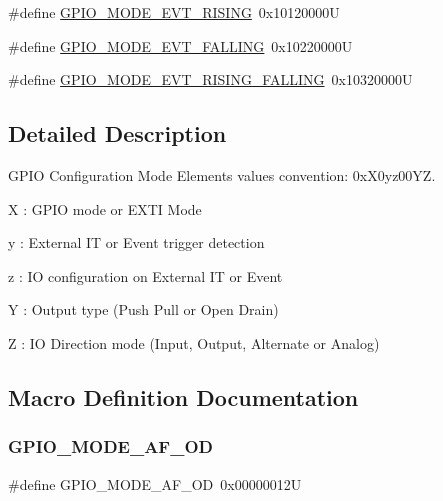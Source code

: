 \begin{DoxyCompactItemize}
\item 
\#define \mbox{\hyperlink{group___g_p_i_o__mode__define_ga97d78b82ea178ff7a4c35aa60b4e9338}{G\+P\+I\+O\+\_\+\+M\+O\+D\+E\+\_\+\+E\+V\+T\+\_\+\+R\+I\+S\+I\+NG}}~0x10120000U
\item 
\#define \mbox{\hyperlink{group___g_p_i_o__mode__define_gadbfa532b3566783ac6c0e07c2e0ffe5e}{G\+P\+I\+O\+\_\+\+M\+O\+D\+E\+\_\+\+E\+V\+T\+\_\+\+F\+A\+L\+L\+I\+NG}}~0x10220000U
\item 
\#define \mbox{\hyperlink{group___g_p_i_o__mode__define_ga1b760771297ed2fc55a6b13071188491}{G\+P\+I\+O\+\_\+\+M\+O\+D\+E\+\_\+\+E\+V\+T\+\_\+\+R\+I\+S\+I\+N\+G\+\_\+\+F\+A\+L\+L\+I\+NG}}~0x10320000U
\end{DoxyCompactItemize}


\subsection{Detailed Description}
G\+P\+IO Configuration Mode Elements values convention\+: 0x\+X0yz00\+YZ. 


\begin{DoxyItemize}
\item X \+: G\+P\+IO mode or E\+X\+TI Mode
\item y \+: External IT or Event trigger detection
\item z \+: IO configuration on External IT or Event
\item Y \+: Output type (Push Pull or Open Drain)
\item Z \+: IO Direction mode (Input, Output, Alternate or Analog) 
\end{DoxyItemize}

\subsection{Macro Definition Documentation}
\mbox{\label{group___g_p_i_o__mode__define_ga282b9fd37c8ef31daba314ffae6bf023}} 
\subsubsection{\texorpdfstring{G\+P\+I\+O\+\_\+\+M\+O\+D\+E\+\_\+\+A\+F\+\_\+\+OD}{GPIO\_MODE\_AF\_OD}}
{\footnotesize\ttfamily \#define G\+P\+I\+O\+\_\+\+M\+O\+D\+E\+\_\+\+A\+F\+\_\+\+OD~0x00000012U}

